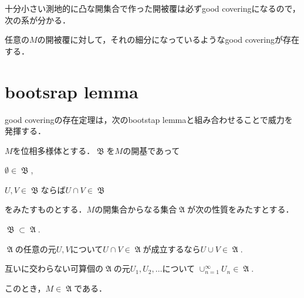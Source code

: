 \documentclass[uplatex]{jsarticle}
\begin{document}
十分小さい測地的に凸な開集合で作った開被覆は必ずgood coveringになるので，次の系が分かる．

\begin{corollary}
  任意の$M$の開被覆に対して，それの細分になっているようなgood coveringが存在する．
\end{corollary}

\section{bootsrap lemma}

good coveringの存在定理は，次のbootstap lemmaと組み合わせることで威力を発揮する．

\begin{theorem}
  $M$を位相多様体とする．$\mfrakB$を$M$の開基であって
  \begin{enumromanp}
    \item $\emptyset\in \mfrakB$,
    \item $U, V\in \mfrakB$ならば$U\cap V \in \mfrakB$
  \end{enumromanp}
  をみたすものとする．$M$の開集合からなる集合$\mfrakA$が次の性質をみたすとする．
  \begin{enumarabicp}
    \item $\mfrakB\subset \mfrakA$.
    \item $\mfrakA$の任意の元$U, V$について$U\cap V\in \mfrakA$が成立するなら$U\cup V\in \mfrakA$.
    \item 互いに交わらない可算個の$\mfrakA$の元$U_1, U_2, \dots$について
    $\cup_{n=1}^\infty U_n\in \mfrakA$.
  \end{enumarabicp}
  このとき，$M\in \mfrakA$である．
\end{theorem}
\end{document}
